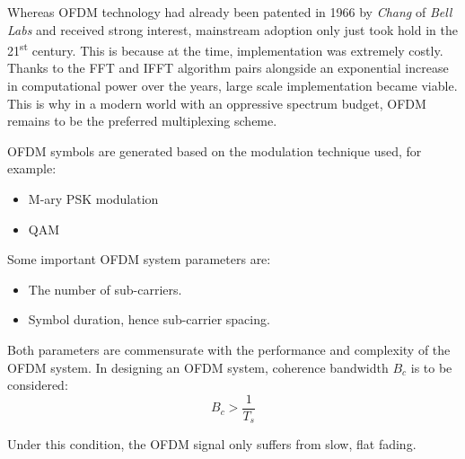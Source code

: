 Whereas \gls{OFDM} technology had already been patented in 1966 by \emph{Chang} of \emph{Bell Labs}\cite{ofdm_intro} and received strong interest, mainstream adoption only just took hold in the 21\textsuperscript{st} century. This is because at the time, implementation was extremely costly.
Thanks to the \gls{FFT} and \gls{IFFT} algorithm pairs alongside an exponential increase in computational power over the years, large scale implementation became viable. This is why in a modern world with an oppressive spectrum budget, \gls{OFDM} remains to be the preferred multiplexing scheme.

\gls{OFDM} symbols are generated based on the modulation technique used, for example:
\begin{itemize}
	\item M-ary \gls{PSK} modulation
	\item \gls{QAM}
\end{itemize}
Some important \gls{OFDM} system parameters are:
\begin{itemize}
	\item The number of sub-carriers.
	\item Symbol duration, hence sub-carrier spacing.
\end{itemize}
Both parameters are commensurate with the performance and complexity of the \gls{OFDM} system\cite{wireless_design}. In designing an \gls{OFDM} system, coherence bandwidth \(B_c\) is to be considered:
\[
	B_c > \frac{1}{T_s}
\]
\begin{mathDef}
\end{mathDef}
Under this condition, the OFDM signal only suffers from slow, flat fading.
